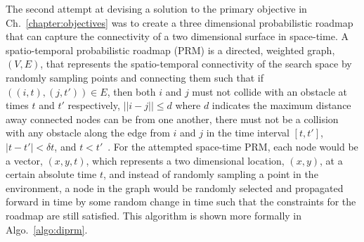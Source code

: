 The second attempt at devising a solution to the primary objective in
Ch.~\ref{chapter:objectives} was to create a three dimensional probabilistic
roadmap that can capture the connectivity of a two dimensional surface in
space-time. A spatio-temporal probabilistic roadmap (PRM) is a directed,
weighted graph, $(V, E)$, that represents the spatio-temporal connectivity of
the search space by randomly sampling points and connecting them such that if
$((i, t), (j, t')) \in E$, then both $i$ and $j$ must not collide with an
obstacle at times $t$ and $t'$ respectively, $||i - j|| \leq d$ where $d$
indicates the maximum distance away connected nodes can be from one another,
there must not be a collision with any obstacle along the edge from $i$ and $j$
in the time interval $[t, t']$, $|t - t'| < \delta t$, and $t < t'$~\cite{prm,
stprm}.  For the attempted space-time PRM, each node would be a vector, $(x, y,
t)$, which represents a two dimensional location, $(x, y)$, at a certain
absolute time $t$, and instead of randomly sampling a point in the environment,
a node in the graph would be randomly selected and propagated forward in time
by some random change in time such that the constraints for the roadmap are
still satisfied.  This algorithm is shown more formally in
Algo.~\ref{algo:diprm}.

